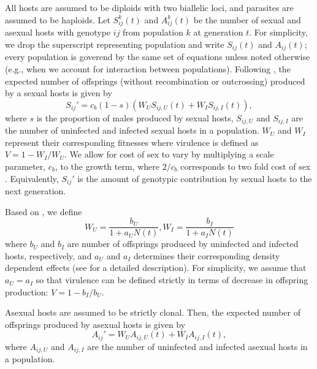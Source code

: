 \documentclass{article}\usepackage[]{graphicx}\usepackage[]{color}
\begin{document}
All hosts are assumed to be diploids with two biallelic loci, and parasites are assumed to be haploids.
Let $S_{ij}^k(t)$ and $A_{ij}^k(t)$ be the number of sexual and asexual hosts with genotype $ij$ from population $k$ at generation $t$. 
For simplicity, we drop the superscript representing population and write $S_{ij}(t)$ and $A_{ij}(t)$;
every population is goverend by the same set of equations unless noted otherwise (e.g., when we account for interaction between populations).
Following \cite{lively2010epidemiological}, the expected number of offsprings (without recombination or outcrossing) produced by a sexual hosts is given by
\begin{equation}
S_{ij}' = c_b (1-s) \left(W_U S_{ij,U} (t) + W_I S_{ij,I} (t)\right),
\end{equation}
where $s$ is the proportion of males produced by sexual hosts, $S_{ij, U}$ and $S_{ij,I}$ are the number of uninfected and infected sexual hosts in a population.
$W_U$ and $W_I$ represent their corresponding fitnesses where virulence is defined as $V = 1-W_I/W_U$.
We allow for cost of sex to vary by multiplying a scale parameter, $c_b$, to the growth term, where $2/c_b$ corresponds to two fold cost of sex \citep{ashby2015diversity}.
Equivalently, $S_{ij}'$ is the amount of genotypic contribution by sexual hosts to the next generation.

Based on \cite{lively2010epidemiological, smith1973stability}, we define
$$
W_U = \frac{b_U}{1 + a_U N(t)}, W_I = \frac{b_I}{1 + a_I N(t)}
$$
where $b_U$ and $b_I$ are number of offsprings produced by uninfected and infected hosts, respectively, and $a_U$ and $a_I$ determines their corresponding density dependent effects (see \cite{lively2010epidemiological} for a detailed description).
For simplicity, we assume that $a_U = a_I$ so that virulence can be defined strictly in terms of decrease in offspring production: $V = 1- b_I/b_U$.

Asexual hosts are assumed to be strictly clonal. Then, the expected number of offsprings produced by asexual hosts is given by
\begin{equation}
A_{ij}' = W_U A_{ij,U} (t) + W_I A_{ij,I} (t),
\end{equation}
where $A_{ij, U}$ and $A_{ij,I}$ are the number of uninfected and infected asexual hosts in a population.
\end{document}
